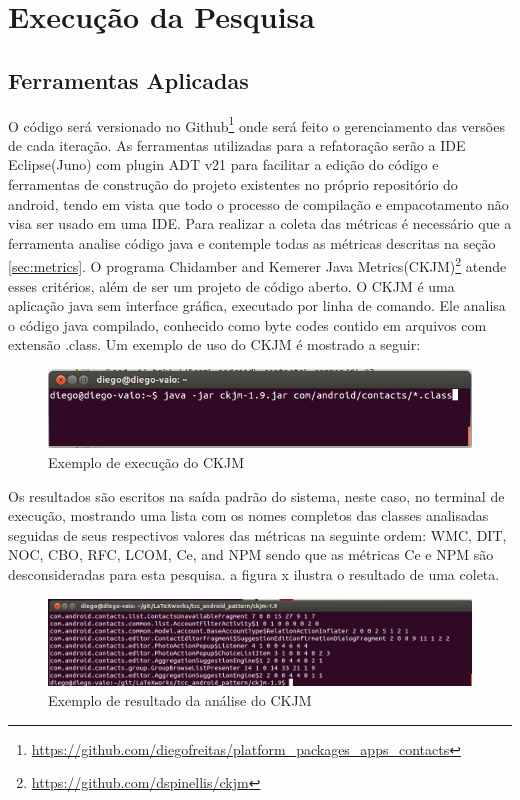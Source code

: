 \chapter{Execução da Pesquisa}


\section{Ferramentas Aplicadas}

O código será versionado no
Github\footnote{\url{https://github.com/diegofreitas/platform_packages_apps_contacts}}
onde será feito o gerenciamento das versões de cada iteração.
As ferramentas utilizadas para a refatoração serão a IDE Eclipse(Juno) com
plugin ADT v21 para facilitar a edição do código e ferramentas de construção
do projeto existentes no próprio repositório do android, tendo em vista que todo
o processo de compilação e empacotamento não visa ser usado em uma IDE.
Para realizar a coleta das métricas é necessário que a ferramenta analise código
java e contemple todas as métricas descritas na seção \ref{sec:metrics}. O
programa Chidamber and Kemerer Java
Metrics(CKJM)\footnote{\url{https://github.com/dspinellis/ckjm}} atende esses
critérios, além de ser um projeto de código aberto. O CKJM é uma aplicação java
sem interface gráfica, executado por linha de comando. Ele analisa o código java
compilado, conhecido como byte codes contido em arquivos com extensão .class. Um
exemplo de uso do CKJM é mostrado a seguir:

\begin{figure}[!h]
	\centering
	\includegraphics[scale=0.53]{img/ckjm_run}
	\caption{Exemplo de execução do CKJM} 
	\label{fig:ckjm_run}
\end{figure}


Os resultados são escritos na saída padrão do sistema, neste caso, no terminal
de execução, mostrando uma lista com os nomes completos das classes
analisadas seguidas de seus respectivos valores das métricas na seguinte
ordem: WMC, DIT, NOC, CBO, RFC, LCOM, Ce, and NPM sendo que as métricas Ce e
NPM são desconsideradas para esta pesquisa. a figura x ilustra o resultado de
uma coleta.


\begin{figure}[!h]
	\centering
	\includegraphics[scale=0.45]{img/ckjm_result}
	\caption{Exemplo de resultado da análise do CKJM} 
	\label{fig:ckjm_result}
\end{figure}


